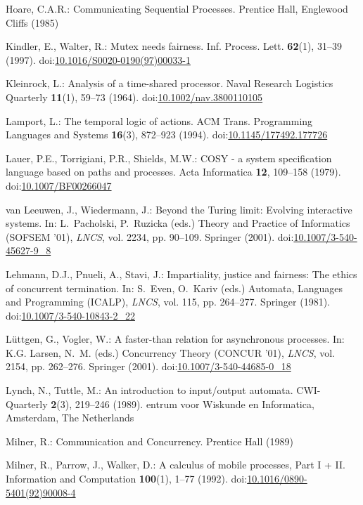 \documentclass[smallcondensed]{svjour3}
\providecommand{\urlalt}[2]{\href{#1}{#2}}
\providecommand{\doi}[1]{doi:\urlalt{http://dx.doi.org/#1}{#1}}
\newcounter {part}
\begin{document}
\begin{thebibliography}{10}
Hoare, C.A.R.: Communicating Sequential Processes.
\newblock Prentice Hall, Englewood Cliffs (1985)

Kindler, E., Walter, R.: Mutex needs fairness.
\newblock Inf. Process. Lett. \textbf{62}(1), 31--39 (1997).
\newblock \doi{10.1016/S0020-0190(97)00033-1}

Kleinrock, L.: Analysis of a time-shared processor.
\newblock Naval Research Logistics Quarterly \textbf{11}(1), 59--73 (1964).
\newblock \doi{10.1002/nav.3800110105}

Lamport, L.: The temporal logic of actions.
\newblock ACM Trans. Programming Languages and Systems \textbf{16}(3), 872--923
  (1994).
\newblock \doi{10.1145/177492.177726}

Lauer, P.E., Torrigiani, P.R., Shields, M.W.: {COSY} - a system specification
  language based on paths and processes.
\newblock Acta Informatica \textbf{12}, 109--158 (1979).
\newblock \doi{10.1007/BF00266047}

van Leeuwen, J., Wiedermann, J.: Beyond the {Turing} limit: Evolving
  interactive systems.
\newblock In: L.~Pacholski, P.~Ruzicka (eds.) Theory and Practice of
  Informatics (SOFSEM '01), \emph{\rm LNCS}, vol. 2234, pp. 90--109. Springer
  (2001).
\newblock \doi{10.1007/3-540-45627-9\_8}

Lehmann, D.J., Pnueli, A., Stavi, J.: Impartiality, justice and fairness: The
  ethics of concurrent termination.
\newblock In: S.~Even, O.~Kariv (eds.) Automata, Languages and Programming
  (ICALP), \emph{\rm LNCS}, vol. 115, pp. 264--277. Springer (1981).
\newblock \doi{10.1007/3-540-10843-2\_22}

L\"{u}ttgen, G., Vogler, W.: A faster-than relation for asynchronous processes.
\newblock In: K.G. Larsen, N.~M. (eds.) Concurrency Theory (CONCUR '01),
  \emph{\rm LNCS}, vol. 2154, pp. 262--276. Springer (2001).
\newblock \doi{10.1007/3-540-44685-0\_18}

Lynch, N., Tuttle, M.: An introduction to input/output automata.
\newblock CWI-Quarterly \textbf{2}(3), 219--246 (1989).
entrum voor Wiskunde en Informatica, Amsterdam, The Netherlands

Milner, R.: Communication and Concurrency.
\newblock Prentice Hall (1989)

Milner, R., Parrow, J., Walker, D.: A calculus of mobile processes, {Part I +
  II}.
\newblock Information and Computation \textbf{100}(1), 1--77 (1992).
\newblock \doi{10.1016/0890-5401(92)90008-4}


\end{thebibliography}
\end{document}
